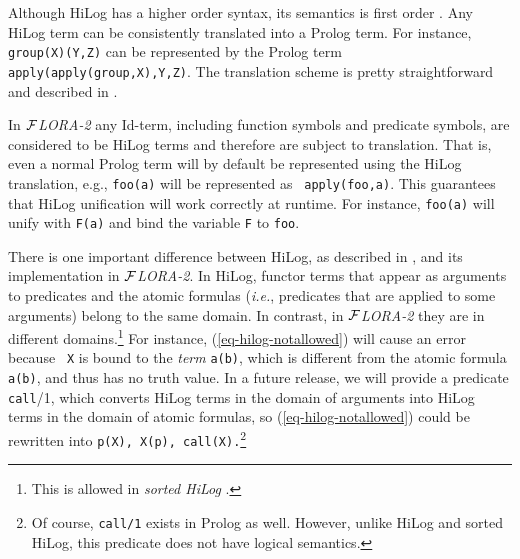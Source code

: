 \documentclass[11pt]{article}
\newcommand{\FLORA}{{\mbox{${\cal F}${\small\it LORA}\rm\emph{-2}}}\xspace}
\begin{document}
%
Although HiLog has a higher order syntax, its semantics is first order
\cite{hilog-jlp}. Any HiLog term can be consistently translated into a
Prolog term. For instance, {\tt group(X)(Y,Z)} can be represented by the
Prolog term {\tt apply(apply(group,X),Y,Z)}. The translation scheme is
pretty straightforward and described in \cite{hilog-jlp}.

In \FLORA any Id-term, including function symbols and predicate symbols,
are considered to be HiLog terms and therefore are subject to translation.
That is, even a normal Prolog term will by default be represented using the
HiLog translation, e.g., {\tt foo(a)} will be represented as {\tt
  apply(foo,a)}. This guarantees that HiLog unification will work correctly
at runtime. For instance, {\tt foo(a)} will unify with {\tt F(a)} and bind
the variable {\tt F} to {\tt foo}.

There is one important difference between HiLog, as described in
\cite{hilog-jlp}, and its implementation in \FLORA. In HiLog, functor terms
that appear as arguments to predicates and the atomic formulas ({\it i.e.},
predicates that are applied to some arguments) belong to the same domain. 
In contrast, in \FLORA they are in different domains.\footnote{
  This is allowed in \emph{sorted HiLog} \cite{hilog-icdt-95}. 
  }
For instance, (\ref{eq-hilog-notallowed}) will cause an error because {\tt
  X} is bound to the \emph{term} {\tt a(b)}, which is different from the
atomic formula {\tt a(b)}, and thus has no truth value.  In a future
release, we will provide a predicate {\tt call}/1, which converts HiLog
terms in the domain of arguments into HiLog terms in the domain of atomic
formulas, so (\ref{eq-hilog-notallowed}) could be rewritten into {\tt p(X),
  X(p), call(X).}\footnote{
  Of course, {\tt call/1} exists in Prolog as well. However, unlike HiLog
  and sorted HiLog, this predicate does not have logical semantics.
  }
\end{document}
